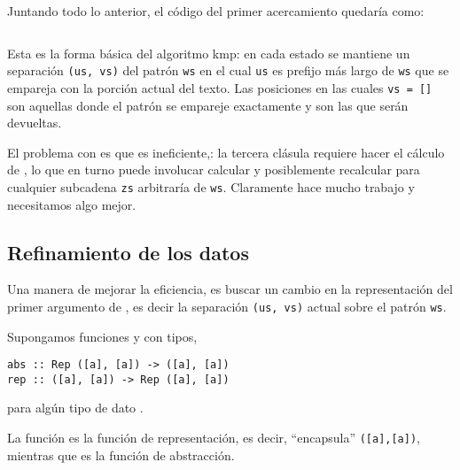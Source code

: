 

Juntando todo lo anterior, el código del primer acercamiento quedaría como:

\inputminted{haskell}{codigo/haskell/NaiveMatching.hs}


Esta es la forma básica del algoritmo kmp: en cada estado se mantiene un separación \texttt{(us, vs)}
del patrón \texttt{ws} en el cual \texttt{us} es prefijo más largo de \texttt{ws} que se empareja
con la porción actual del texto. Las posiciones en las cuales \texttt{vs = []} son aquellas donde el patrón
se empareje exactamente y son las que serán devueltas.

El problema con  es que es ineficiente,: la tercera clásula requiere hacer el cálculo de
, lo que en turno puede involucar calcular y posiblemente recalcular
 para cualquier subcadena \texttt{zs} arbitraría de \texttt{ws}. Claramente
 hace mucho trabajo y necesitamos algo mejor. 

\subsection{Refinamiento de los datos}

Una manera de mejorar la eficiencia, es buscar un cambio en la representación del primer argumento 
de , es decir la separación \texttt{(us, vs)} actual sobre el patrón \texttt{ws}.

Supongamos funciones  y  con tipos,

\begin{verbatim}
abs :: Rep ([a], [a]) -> ([a], [a])
rep :: ([a], [a]) -> Rep ([a], [a])
\end{verbatim}

para algún tipo de dato .

La función  es la función de representación, es decir, ``encapsula'' \texttt{([a],[a])},
mientras que  es la función de abstracción. %

